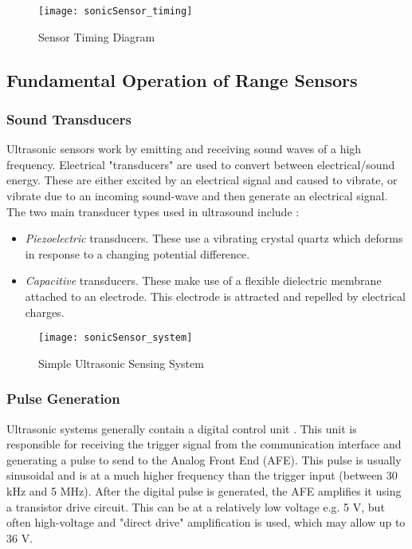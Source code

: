 \begin{figure}[!htb]
  \centering
  \texttt{[image: sonicSensor\_timing]}
  \caption{Sensor Timing Diagram \cite{datasheetHCSR04}}
  \label{fig:sonicSensor_timing}
\end{figure}

\subsection{Fundamental Operation of Range Sensors}

\subsubsection{Sound Transducers}

Ultrasonic sensors work by emitting and receiving sound waves of a high frequency. Electrical "transducers" are used to convert between electrical/sound energy.
These are either excited by an electrical signal and caused to vibrate, or vibrate due to an incoming sound-wave and then generate an electrical signal.
The two main transducer types used in ultrasound include \cite{ultrasonicSensorWorkings}:
\begin{itemize}
    \item \textit{Piezoelectric} transducers. These use a vibrating crystal quartz which deforms in response to a changing potential difference.
    \item \textit{Capacitive} transducers. These make use of a flexible dielectric membrane attached to an electrode. This electrode is attracted and repelled
          by electrical charges.
\end{itemize}

\begin{figure}[!htb]
    \centering
    \texttt{[image: sonicSensor\_system]}
    \caption{Simple Ultrasonic Sensing System \cite{ultrasonicSensorBasics}}
    \label{fig:sonicSensor_system}
  \end{figure}

\subsubsection{Pulse Generation}

Ultrasonic systems generally contain a digital control unit \cite{ultrasonicSensorBasics}. This unit is responsible for receiving the trigger signal from the communication interface and generating
a pulse to send to the Analog Front End (AFE). This pulse is usually sinusoidal and is at a much higher frequency than the trigger input (between 30 kHz and 5 MHz).
After the digital pulse is generated, the AFE amplifies it using a transistor drive circuit.
This can be at a relatively low voltage e.g. 5 V, but often high-voltage and "direct drive" amplification is used, which may allow up to 36 V.

